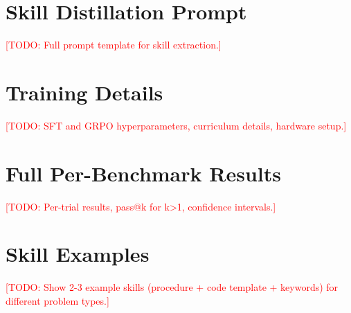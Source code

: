 \documentclass[11pt]{article}
\newcommand{\todo}[1]{\textcolor{red}{[TODO: #1]}}
\begin{document}
\appendix

\section{Skill Distillation Prompt}
\label{app:distill_prompt}
\todo{Full prompt template for skill extraction.}

\section{Training Details}
\label{app:training}
\todo{SFT and GRPO hyperparameters, curriculum details, hardware setup.}

\section{Full Per-Benchmark Results}
\label{app:full_results}
\todo{Per-trial results, pass@k for k>1, confidence intervals.}

\section{Skill Examples}
\label{app:skill_examples}
\todo{Show 2-3 example skills (procedure + code template + keywords) for different problem types.}
\end{document}
